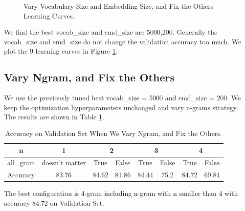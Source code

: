 \documentclass[10pt,a4paper]{article}
\begin{document}
\begin{figure}[!ht]
{}	
\caption{\label{fig:vocab_emd}Vary Vocabulary Size and Embedding Size,  and Fix the Others Learning Curves.}
\end{figure}

We find the best vocab\_size and emd\_size are 5000,200. Generally the vocab\_size and emd\_size do not change the validation accuracy too much. We plot the 9 learning curves in Figure \ref{fig:vocab_emd}.

 
\subsection{Vary Ngram, and Fix the Others}
We use the previously tuned best vocab\_size = 5000 and emd\_size = 200. We keep the optimization hyperparameters unchanged and vary n-grams strategy. The results are shown in Table \ref{tab: ngram}.
\begin{table}[!ht]
\centering
\begin{tabular}{|c|c|c|c|c|c|c|c|}
\hline
n & 1 &\multicolumn{2}{|c|}{2} & \multicolumn{2}{|c|}{3} & \multicolumn{2}{|c|}{4}\\ \hline
all\_gram & doesn't matter & True & False & True & False & True & False \\ \hline
Accuracy & 83.76 & 84.62 & 81.86 & 84.44 & 75.2 & 84.72 & 69.84\\ \hline
\end{tabular}
\caption{\label{tab: ngram}Accuracy on Validation Set When We Vary Ngram, and Fix the Others.}
\end{table}
The best configuration is 4-gram including n-gram with n smaller than 4 with accuracy 84.72 on Validation Set.
\end{document}
